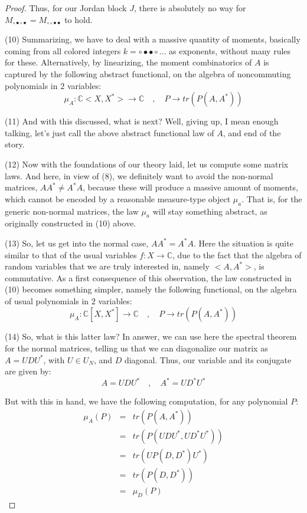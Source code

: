 \documentclass[12pt]{amsbook}
\begin{document}
\begin{proof}
Thus, for our Jordan block $J$, there is absolutely no way for $M_{\circ\bullet\circ\bullet}=M_{\circ\circ\bullet\bullet}$ to hold.

\medskip

(10) Summarizing, we have to deal with a massive quantity of moments, basically coming from all colored integers $k=\circ\bullet\bullet\circ\ldots$ as exponents, without many rules for these. Alternatively, by linearizing, the moment combinatorics of $A$ is captured by the following abstract functional, on the algebra of noncommuting polynomials in $2$ variables:
$$\mu_A:\mathbb C<X,X^*>\to\mathbb C\quad,\quad P\to tr(P(A,A^*))$$

(11) And with this discussed, what is next? Well, giving up, I mean enough talking, let's just call the above abstract functional law of $A$, and end of the story.

\medskip

(12) Now with the foundations of our theory laid, let us compute some matrix laws. And here, in view of (8), we definitely want to avoid the non-normal matrices, $AA^*\neq A^*A$, because these will produce a massive amount of moments, which cannot be encoded by a reasonable measure-type object $\mu_a$. That is, for the generic non-normal matrices, the law $\mu_a$ will stay something abstract, as originally constructed in (10) above.

\medskip

(13) So, let us get into the normal case, $AA^*=A^*A$. Here the situation is quite similar to that of the usual variables $f:X\to\mathbb C$, due to the fact that the algebra of random variables that we are truly interested in, namely $<A,A^*>$, is commutative. As a first consequence of this observation, the law constructed in (10) becomes something simpler, namely the following functional, on the algebra of usual polynomials in $2$ variables:
$$\mu_A:\mathbb C[X,X^*]\to\mathbb C\quad,\quad P\to tr(P(A,A^*))$$

(14) So, what is this latter law? In answer, we can use here the spectral theorem for the normal matrices, telling us that we can diagonalize our matrix as $A=UDU^*$, with $U\in U_N$, and $D$ diagonal. Thus, our variable and its conjugate are given by:
$$A=UDU^*\quad,\quad A^*=UD^*U^*$$

But with this in hand, we have the following computation, for any polynomial $P$:
\begin{eqnarray*}
\mu_A(P)
&=&tr(P(A,A^*))\\
&=&tr(P(UDU^*,UD^*U^*))\\
&=&tr(UP(D,D^*)U^*)\\
&=&tr(P(D,D^*))\\
&=&\mu_D(P)
\end{eqnarray*}


\end{proof}
\end{document}
